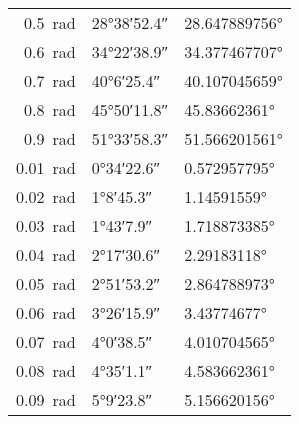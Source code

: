 \begin{center}
\begin{tabular}{rll}
\SI{0.5}{\radian}	&\ang{28;38;52.4}  &\ang[round-precision=\lungarrotandamento,round-mode=places]{28.647889756}  \\
\SI{0.6}{\radian}	&\ang{34;22;38.9}  &\ang[round-precision=\lungarrotandamento,round-mode=places]{34.377467707}  \\
\SI{0.7}{\radian}	&\ang{40;6;25.4}  &\ang[round-precision=\lungarrotandamento,round-mode=places]{40.107045659}  \\
\SI{0.8}{\radian}	&\ang{45;50;11.8}  &\ang[round-precision=\lungarrotandamento,round-mode=places]{45.83662361}  \\
\SI{0.9}{\radian}	&\ang{51;33;58.3}  &\ang[round-precision=\lungarrotandamento,round-mode=places]{51.566201561}  \\
\midrule
\SI{0.01}{\radian}	&\ang{0;34;22.6}  &\ang[round-precision=\lungarrotandamento,round-mode=places]{0.572957795}  \\
\SI{0.02}{\radian}	&\ang{1;8;45.3}  &\ang[round-precision=\lungarrotandamento,round-mode=places]{1.14591559}  \\
\SI{0.03}{\radian}	&\ang{1;43;7.9}  &\ang[round-precision=\lungarrotandamento,round-mode=places]{1.718873385}  \\
\SI{0.04}{\radian}	&\ang{2;17;30.6}  &\ang[round-precision=\lungarrotandamento,round-mode=places]{2.29183118}  \\
\SI{0.05}{\radian}	&\ang{2;51;53.2}  &\ang[round-precision=\lungarrotandamento,round-mode=places]{2.864788973}  \\
\SI{0.06}{\radian}	&\ang{3;26;15.9}  &\ang[round-precision=\lungarrotandamento,round-mode=places]{3.43774677}  \\
\SI{0.07}{\radian}	&\ang{4;0;38.5}  &\ang[round-precision=\lungarrotandamento,round-mode=places]{4.010704565}  \\
\SI{0.08}{\radian}	&\ang{4;35;1.1}  &\ang[round-precision=\lungarrotandamento,round-mode=places]{4.583662361}  \\
\SI{0.09}{\radian}	&\ang{5;9;23.8}  &\ang[round-precision=\lungarrotandamento,round-mode=places]{5.156620156}  \\
\bottomrule
\end{tabular} 
\end{center}
